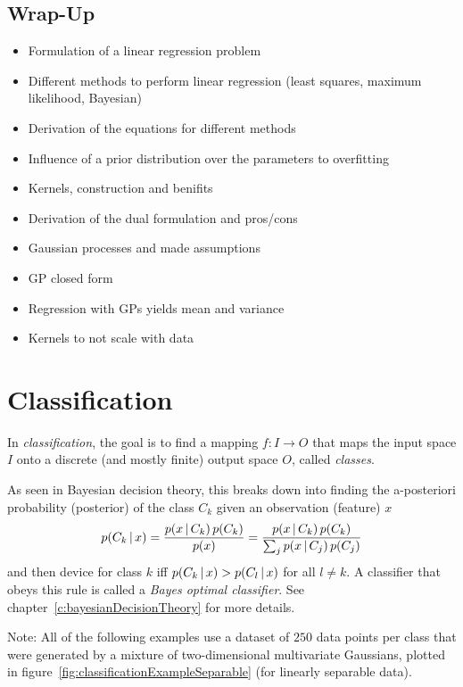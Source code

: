 	\section{Wrap-Up}
		\begin{itemize}
			\item Formulation of a linear regression problem
			\item Different methods to perform linear regression (least squares, maximum likelihood, Bayesian)
			\item Derivation of the equations for different methods
			\item Influence of a prior distribution over the parameters to overfitting
			\item Kernels, construction and benifits
			\item Derivation of the dual formulation and pros/cons
			\item Gaussian processes and made assumptions
			\item GP closed form
			\item Regression with GPs yields mean and variance
			\item Kernels to not scale with data
		\end{itemize}

\chapter{Classification}
In \emph{classification}, the goal is to find a mapping \( f : I \to O \) that maps the input space \(I\) onto a discrete (and mostly finite) output space \(O\), called \emph{classes}.

As seen in Bayesian decision theory, this breaks down into finding the a-posteriori probability (posterior) of the class \(C_k\) given an observation (feature) \(x\)
\begin{equation}
	p(C_k \,\vert\, x) = \frac{p(x \,\vert\, C_k) \, p(C_k)}{p(x)} = \frac{p(x \,\vert\, C_k) \, p(C_k)}{\sum_j p(x \,\vert\, C_j) \, p(C_j)}
\end{equation}
and then device for class \(k\) iff \( p(C_k \,\vert\, x) > p(C_l \,\vert\, x) \) for all \( l \neq k \). A classifier that obeys this rule is called a \emph{Bayes optimal classifier}. See chapter~\ref{c:bayesianDecisionTheory} for more details.

Note: All of the following examples use a dataset of \(250\) data points per class that were generated by a mixture of two-dimensional multivariate Gaussians, plotted in figure~\ref{fig:classificationExampleSeparable} (for linearly separable data).

